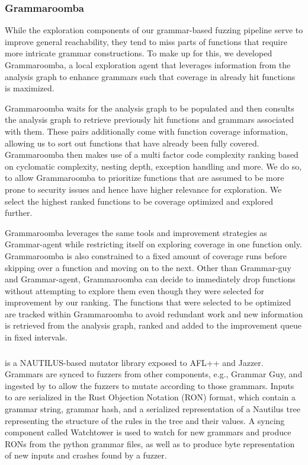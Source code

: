 \subsubsection{Grammaroomba}

While the exploration components of our grammar-based fuzzing pipeline serve to improve general reachability, they tend to miss parts of functions that require more intricate grammar constructions.
To make up for this, we developed Grammaroomba, a local exploration agent that leverages information from the analysis graph to enhance grammars such that coverage in already hit functions is maximized.

Grammaroomba waits for the analysis graph to be populated and then consults the analysis graph to retrieve previously hit functions and grammars associated with them. These pairs additionally come with function coverage information, allowing us to sort out functions that have already been fully covered. Grammaroomba then makes use of a multi factor code complexity ranking based on cyclomatic complexity, nesting depth, exception handling and more. We do so, to allow Grammaroomba to prioritize functions that are assumed to be more prone to security issues and hence have higher relevance for exploration. We select the highest ranked functions to be coverage optimized and explored further.

Grammaroomba leverages the same tools and improvement strategies as Grammar-agent while restricting itself on exploring coverage in one function only. Grammaroomba is also constrained to a fixed amount of coverage runs before skipping over a function and moving on to the next. Other than Grammar-guy and Grammar-agent, Grammaroomba can decide to immediately drop functions without attempting to explore them even though they were selected for improvement by our ranking. The functions that were selected to be optimized are tracked within Grammaroomba to avoid redundant work and new information is retrieved from the analysis graph, ranked and added to the improvement queue in fixed intervals.

\subsubsection{\revolver}

\revolver is a NAUTILUS-based mutator library exposed to AFL++ and Jazzer. Grammars are synced to fuzzers from other components, e.g., Grammar Guy, and ingested by \revolver to allow the fuzzers to mutate according to those grammars. Inputs to \revolver are serialized in the Rust Objection Notation (RON) format, which contain a grammar string, grammar hash, and a serialized representation of a Nautilus tree representing the structure of the rules in the tree and their values. A syncing component called Watchtower is used to watch for new grammars and produce RONs from the python grammar files, as well as to produce byte representation of new inputs and crashes found by a fuzzer.

